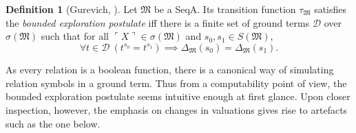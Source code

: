 \documentclass[12pt, twoside]{memoir}
\numberwithin{equation}{section}
\theoremstyle{definition}
\newtheorem{defi}[thm]{Definition}
\theoremstyle{remark}
\theoremstyle{definition}
\theoremstyle{definition}
\theoremstyle{definition}
\theoremstyle{remark}
\begin{document}
\begin{defi}[Gurevich, \cite{gurevich}]\label{def217}
Let $\mathfrak{M}$ be a SeqA. Its transition function $\tau_{\mathfrak{M}}$ satisfies the \emph{bounded exploration postulate} iff there is a finite set of ground terms $\mathcal{D}$ over $\sigma(\mathfrak{M})$ such that for all $\ulcorner X \urcorner \in \sigma(\mathfrak{M})$ and $s_0, s_1 \in S(\mathfrak{M})$,
\begin{equation*}
    \forall t \in \mathcal{D} \ (t^{s_0} = t^{s_1}) \implies \Delta_{\mathfrak{M}}(s_0) = \Delta_{\mathfrak{M}}(s_1) \text{.}
\end{equation*}
\end{defi}

As every relation is a boolean function, there is a canonical way of simulating relation symbols in a ground term. Thus from a computability point of view, the bounded exploration postulate seems intuitive enough at first glance. Upon closer inspection, however, the emphasis on changes in valuations gives rise to artefacts such as the one below.
\end{document}
